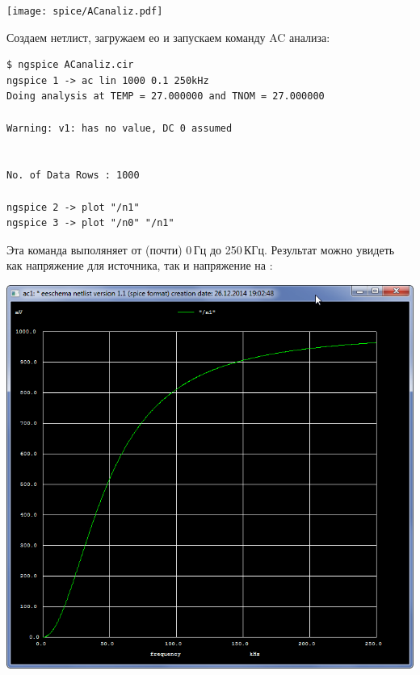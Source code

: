 \texttt{[image: spice/ACanaliz.pdf]}

Создаем нетлист, загружаем ео и запускаем команду AC анализа:

\begin{verbatim}
$ ngspice ACanaliz.cir
ngspice 1 -> ac lin 1000 0.1 250kHz
Doing analysis at TEMP = 27.000000 and TNOM = 27.000000

Warning: v1: has no value, DC 0 assumed


No. of Data Rows : 1000

ngspice 2 -> plot "/n1"
ngspice 3 -> plot "/n0" "/n1"
\end{verbatim}

Эта команда выполяняет  от (почти) 0\,Гц до 250\,КГц.
Результат можно увидеть как напряжение для источника, так и напряжение на
:

\pagebreak\noindent
\includegraphics[height=\textheight]{spice/spice4.png}

